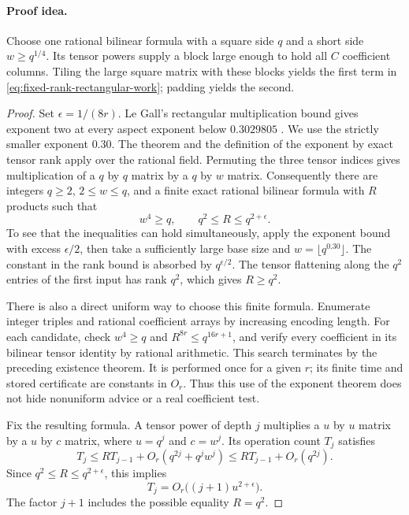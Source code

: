 \paragraph{Proof idea.}
Choose one rational bilinear formula with a square side $q$ and a
short side $w\ge q^{1/4}$. Its tensor powers supply a block large
enough to hold all $C$ coefficient columns. Tiling the large square
matrix with these blocks yields the first term in
\eqref{eq:fixed-rank-rectangular-work}; padding yields the second.

\begin{proof}
Set $\epsilon=1/(8r)$. Le Gall's rectangular multiplication bound
gives exponent two at every aspect exponent below $0.3029805$
\cite{legall2012rect}. We use the strictly smaller exponent $0.30$.
The theorem and the definition of the exponent by exact tensor rank
apply over the rational field. Permuting the three tensor indices
gives multiplication of a $q$ by $q$ matrix by a $q$ by $w$ matrix.
Consequently there are integers $q\ge2$, $2\le w\le q$, and a finite
exact rational bilinear formula with $R$ products such that
\[
 w^4\ge q,\qquad q^2\le R\le q^{2+\epsilon}.
 \tag{**}\label{eq:fixed-rank-base-parameters}
\]
To see that the inequalities can hold simultaneously, apply the
exponent bound with excess $\epsilon/2$, then take a sufficiently
large base size and $w=\lfloor q^{0.30}\rfloor$.
The constant in the rank bound is absorbed by $q^{\epsilon/2}$.
The tensor flattening along the $q^2$ entries of the first input
has rank $q^2$, which gives $R\ge q^2$.

There is also a direct uniform way to choose this finite formula.
Enumerate integer triples and rational coefficient arrays by increasing
encoding length. For each candidate, check
$w^4\ge q$ and $R^{8r}\le q^{16r+1}$, and verify every coefficient
in its bilinear tensor identity by rational arithmetic. This search
terminates by the preceding existence theorem. It is performed once
for a given $r$; its finite time and stored certificate are constants
in $O_r$. Thus this use of the exponent theorem does not hide
nonuniform advice or a real coefficient test.

Fix the resulting formula. A tensor power of depth $j$ multiplies
a $u$ by $u$ matrix by a $u$ by $c$ matrix, where
$u=q^j$ and $c=w^j$. Its operation count $T_j$ satisfies
\[
 T_j\le R T_{j-1}+O_r(q^{2j}+q^jw^j)
       \le R T_{j-1}+O_r(q^{2j}).
\]
Since $q^2\le R\le q^{2+\epsilon}$, this implies
\[
 T_j=O_r\bigl((j+1)u^{2+\epsilon}\bigr).
\]
The factor $j+1$ includes the possible equality $R=q^2$.


\end{proof}
